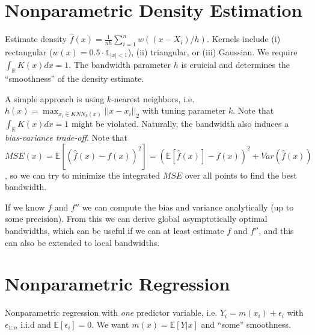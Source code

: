 \section{Nonparametric Density Estimation}\label{sec:nonparametric_density_estimation}
\begin{sectionbox}
  Estimate density $\hat f(x) = \frac{1}{nh}\sum_{i=1}^n w((x-X_i)/h)$.
  Kernels include (i) rectangular ($w(x) = 0.5\cdot\mathds{1}_{|x|<1}$), (ii) triangular, or (iii) Gaussian.
  We require $\int_\mathbb{R}K(x)dx = 1$.
  The bandwidth parameter $h$ is cruicial and determines the ``smoothness'' of the density estimate.
\end{sectionbox}
\begin{sectionbox}\nospacing{}
  A simple approach is using $k$-nearest neighbors, i.e. $h(x)=\max_{x_i \in \mathit{KNN}_k(x)} ||x-x_i||_2$ with tuning parameter $k$.
  Note that $\int_\mathbb{R} K(x)dx = 1$ might be violated.
  Naturally, the bandwidth also induces a \emph{bias-variance trade-off}.
  Note that
  \(
    MSE(x) = \mathbb{E}\left[\left(\hat f(x)-f(x)\right)^2\right]=\left(\mathbb{E}[\hat f(x)] - f(x)\right)^2 + Var(\hat f(x))
  \), so we can try to minimize the integrated $MSE$ over all points to find the best bandwidth.

  If we know $f$ and $f''$ we can compute the bias and variance analytically (up to some precision).
  From this we can derive global asymptotically optimal bandwidths, which can be useful if we can at least estimate $f$ and $f''$, and this can also be extended to local bandwidths.
  
\end{sectionbox}


\section{Nonparametric Regression}\label{sec:nonparametric_regression}
Nonparametric regression with \emph{one} predictor variable, i.e. $Y_{i} = m(x_{i}) + \epsilon_{i}$ with $\epsilon_{1:n}$ i.i.d and $\mathbb{E}[\epsilon_{i}] = 0$. We want $m(x) = \mathbb{E}[Y|x]$ and ``some'' smoothness.

